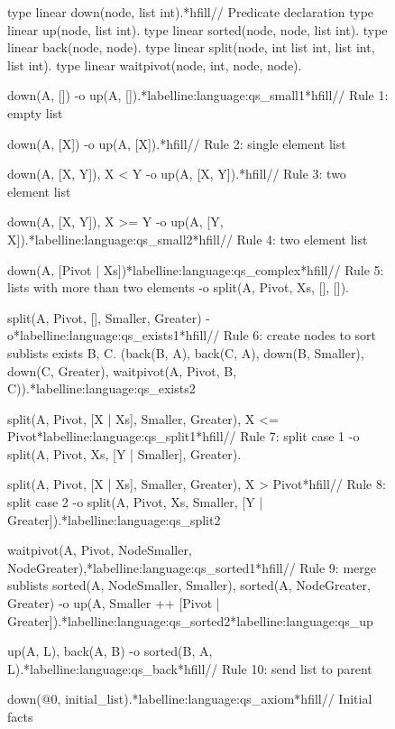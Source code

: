 \begin{figure}[h!]
\begin{LineCode}[commandchars=\*\{\}]
type linear down(node, list int).*hfill// Predicate declaration
type linear up(node, list int).
type linear sorted(node, node, list int).
type linear back(node, node).
type linear split(node, int list int, list int, list int).
type linear waitpivot(node, int, node, node).

down(A, []) -o up(A, []).*label{line:language:qs_small1}*hfill// Rule 1: empty list

down(A, [X]) -o up(A, [X]).*hfill// Rule 2: single element list

down(A, [X, Y]), X < Y -o up(A, [X, Y]).*hfill// Rule 3: two element list

down(A, [X, Y]), X >= Y -o up(A, [Y, X]).*label{line:language:qs_small2}*hfill// Rule 4: two element list

down(A, [Pivot | Xs])*label{line:language:qs_complex}*hfill// Rule 5: lists with more than two elements
   -o split(A, Pivot, Xs, [], []).

split(A, Pivot, [], Smaller, Greater) -o*label{line:language:qs_exists1}*hfill// Rule 6: create nodes to sort sublists
   exists B, C. (back(B, A), back(C, A),
                 down(B, Smaller), down(C, Greater), waitpivot(A, Pivot, B, C)).*label{line:language:qs_exists2}

split(A, Pivot, [X | Xs], Smaller, Greater), X <= Pivot*label{line:language:qs_split1}*hfill// Rule 7: split case 1
   -o split(A, Pivot, Xs, [Y | Smaller], Greater).

split(A, Pivot, [X | Xs], Smaller, Greater), X > Pivot*hfill// Rule 8: split case 2
   -o split(A, Pivot, Xs, Smaller, [Y | Greater]).*label{line:language:qs_split2}
   
waitpivot(A, Pivot, NodeSmaller, NodeGreater),*label{line:language:qs_sorted1}*hfill// Rule 9: merge sublists
sorted(A, NodeSmaller, Smaller),
sorted(A, NodeGreater, Greater)
   -o up(A, Smaller ++ [Pivot | Greater]).*label{line:language:qs_sorted2}*label{line:language:qs_up}

up(A, L), back(A, B) -o sorted(B, A, L).*label{line:language:qs_back}*hfill// Rule 10: send list to parent

down(@0, initial_list).*label{line:language:qs_axiom}*hfill// Initial facts
\end{LineCode}
  \label{language:code:quicksort}
\end{figure}

